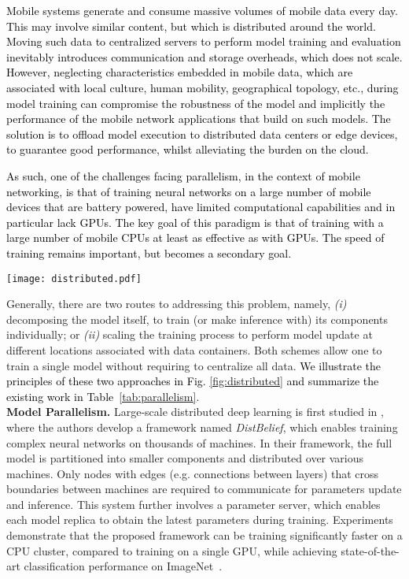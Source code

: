 \documentclass[journal,comsoc,letter]{IEEEtran}
\newcommand{\edit}[1]{\textcolor{black}{#1}}
\begin{document}
\edit{Mobile systems generate and consume massive volumes of mobile data every day. This may involve similar content, but which is distributed around the world. Moving such data to centralized servers to perform model training and evaluation inevitably introduces communication and storage overheads, which does not scale. However, neglecting characteristics embedded in mobile data, which are associated with local culture, human mobility, geographical topology, etc., during model training can compromise the robustness of the model and implicitly the performance of the mobile network applications that build on such models. The solution is to offload model execution to distributed data centers or edge devices, to guarantee good performance, whilst alleviating the burden on the cloud.}

\edit{As such, one of the challenges facing parallelism, in the context of mobile networking, is that of training neural networks on a large number of mobile devices that are battery powered, have limited computational capabilities and in particular lack GPUs. The key goal of this paradigm is that of training with a large number of mobile CPUs at least as effective as with GPUs. The speed of training remains important, but becomes a secondary goal.}

\begin{figure*}[h!]
\begin{center}
\texttt{[image: distributed.pdf]}
\end{center}
\vspace*{-0,5em}
\caption{\label{fig:distributed} The underlying principles of model parallelism (left) and training parallelism (right).}
\end{figure*}

Generally, there are two routes to addressing this problem, namely, \emph{(i)} decomposing the model itself, to train (or make inference with) its components individually; or \emph{(ii)} scaling the training process to perform model update at different locations associated with data containers. Both schemes allow one to train a single model without requiring to centralize all data. \edit{We illustrate the principles of these two approaches in Fig. \ref{fig:distributed} and summarize the existing work  in Table~\ref{tab:parallelism}.}\\

\noindent \textbf{Model Parallelism.} Large-scale distributed deep learning is first studied in \cite{dean2012large}, where the authors develop a framework named \emph{DistBelief}, which enables training complex neural networks on thousands of machines. In their framework, the full model is partitioned into smaller components and distributed over various machines. Only nodes with edges (e.g. connections between layers) that cross boundaries between machines are required to communicate for parameters update and inference. This system further involves a parameter server, which enables each model replica to obtain the latest parameters during training. Experiments demonstrate that the proposed framework can be training significantly faster on a CPU cluster, compared to training on a single GPU, while achieving state-of-the-art classification performance on ImageNet~\cite{ILSVRC15}.
\end{document}
